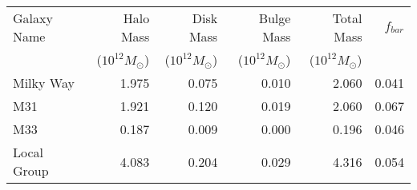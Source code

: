 \documentclass{article}
\begin{document}
\begin{table}[h]
	\centering
	\begin{tabular}{lrrrrr}
		\toprule
		Galaxy Name & Halo Mass & Disk Mass & Bulge Mass & Total Mass & $f_{bar}$ \\
			    & ($10^{12}M_{\odot}$) & ($10^{12}M_{\odot}$) & ($10^{12}M_{\odot}$) & ($10^{12}M_{\odot}$) & \\
		\midrule
		Milky Way & 1.975 & 0.075 & 0.010 & 2.060& 0.041 \\
		M31 & 1.921 & 0.120 & 0.019 & 2.060& 0.067\\
		M33 & 0.187 & 0.009 & 0.000 & 0.196& 0.046\\
		\midrule
		Local Group & 4.083 & 0.204 & 0.029 & 4.316 & 0.054 \\
		\bottomrule
	\end{tabular}
\end{table}
\end{document}
